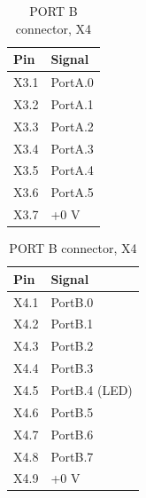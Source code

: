 \documentclass[11pt,a4paper]{article}
\begin{document}
  \begin{table}
    \centering
      \begin{minipage}{0.45\textwidth}
        \begin{tabular}[b]{|p{7mm}|p{15mm}|}
          \hline \textbf{Pin} & \textbf{Signal}\\
          \hline X3.1 & PortA.0\\
          \hline X3.2 & PortA.1\\
          \hline X3.3 & PortA.2\\
          \hline X3.4 & PortA.3\\
          \hline X3.5 & PortA.4\\
          \hline X3.6 & PortA.5\\
          \hline X3.7 & +0 V   \\
          \hline
        \end{tabular}
        \caption{PORT A connector, X3}
        \vspace{25pt}
      \end{minipage}\hfill
      \begin{minipage}{0.45\textwidth}
        \begin{tabular}[b]{|p{7mm}|p{15mm}|}
          \hline \textbf{Pin} & \textbf{Signal}\\
          \hline X4.1 & PortB.0\\
          \hline X4.2 & PortB.1\\
          \hline X4.3 & PortB.2\\
          \hline X4.4 & PortB.3\\
          \hline X4.5 & PortB.4 (LED)\\
          \hline X4.6 & PortB.5\\
          \hline X4.7 & PortB.6\\
          \hline X4.8 & PortB.7\\
          \hline X4.9 & +0 V\\
          \hline
        \end{tabular}
        \caption{PORT B connector, X4}
      \end{minipage}\hfill
  \end{table}
\end{document}

